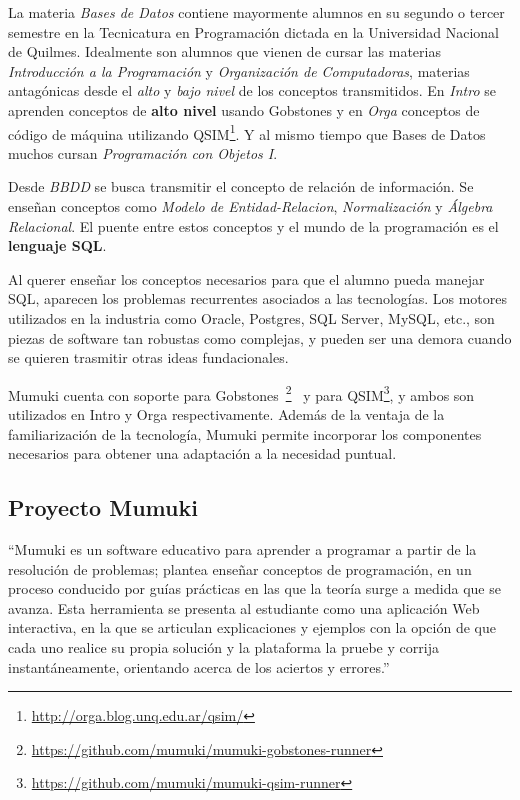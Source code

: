 
La materia \textit{Bases de Datos} contiene mayormente
alumnos en su segundo o tercer semestre en
la Tecnicatura en Programación dictada en la Universidad
Nacional de Quilmes. Idealmente son alumnos que
vienen de cursar las materias \textit{Introducción
a la Programación} y \textit{Organización de Computadoras},
materias antagónicas desde el \textit{alto} y \textit{bajo nivel}
de los conceptos transmitidos. En \textit{Intro} se aprenden conceptos
de \textbf{alto nivel} usando Gobstones y en \textit{Orga} conceptos de código
de máquina utilizando QSIM\footnote{\url{http://orga.blog.unq.edu.ar/qsim/}}.
Y al mismo tiempo que Bases de Datos muchos cursan
\textit{Programación con Objetos I}.

Desde \textit{BBDD} se busca transmitir el concepto de relación
de información. Se enseñan conceptos como \textit{Modelo de
Entidad-Relacion}, \textit{Normalización} y \textit{Álgebra Relacional}.
El puente entre estos conceptos y el mundo de la programación
es el \textbf{lenguaje SQL}.

Al querer enseñar los conceptos necesarios para que el alumno
pueda manejar SQL, aparecen los problemas recurrentes asociados
a las tecnologías. Los motores utilizados en la industria como
Oracle, Postgres, SQL Server, MySQL, etc., son piezas de software
tan robustas como complejas, y pueden ser una demora cuando se
quieren trasmitir otras ideas fundacionales.

Mumuki cuenta con soporte para Gobstones~\footnote{\url{https://github.com/mumuki/mumuki-gobstones-runner}}~\cite{MumukiGobstonesAloi}
y para QSIM\footnote{\url{https://github.com/mumuki/mumuki-qsim-runner}},
y ambos son utilizados en Intro y Orga respectivamente.
Además de la ventaja de la familiarización de la tecnología,
Mumuki permite incorporar los componentes necesarios para
obtener una adaptación a la necesidad puntual.


\subsection{Proyecto Mumuki}

\begin{displayquote}
``Mumuki es un software educativo para aprender a programar a partir de la resolución de problemas;
plantea enseñar conceptos de programación, en un proceso conducido por guías prácticas
en las que la teoría surge a medida que se avanza. Esta herramienta se presenta al
estudiante como una aplicación Web interactiva, en la que se articulan explicaciones
y ejemplos con la opción de que cada uno realice su propia solución y la plataforma
la pruebe y corrija instantáneamente, orientando acerca de los aciertos y errores.''
\end{displayquote}

